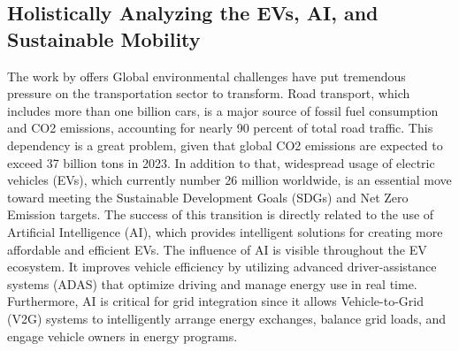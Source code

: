 \documentclass[a4paper, 12pt]{article}
\begin{document}
\subsection{Holistically Analyzing the EVs, AI, and Sustainable Mobility}
The work by \citet{M.rauf2024} offers Global environmental challenges have put tremendous pressure on the transportation sector to transform.  Road transport, which includes more than one billion cars, is a major source of fossil fuel consumption and CO2 emissions, accounting for nearly 90 percent of total road traffic. This dependency is a great problem, given that global CO2 emissions are expected to exceed 37 billion tons in 2023. In addition to that, widespread usage of electric vehicles (EVs), which currently number 26 million worldwide, is an essential move toward meeting the Sustainable Development Goals (SDGs) and Net Zero Emission targets.  The success of this transition is directly related to the use of Artificial Intelligence (AI), which provides intelligent solutions for creating more affordable and efficient EVs. The influence of AI is visible throughout the EV ecosystem. It improves vehicle efficiency by utilizing advanced driver-assistance systems (ADAS) that optimize driving and manage energy use in real time.  Furthermore, AI is critical for grid integration since it allows Vehicle-to-Grid (V2G) systems to intelligently arrange energy exchanges, balance grid loads, and engage vehicle owners in energy programs.
\end{document}
